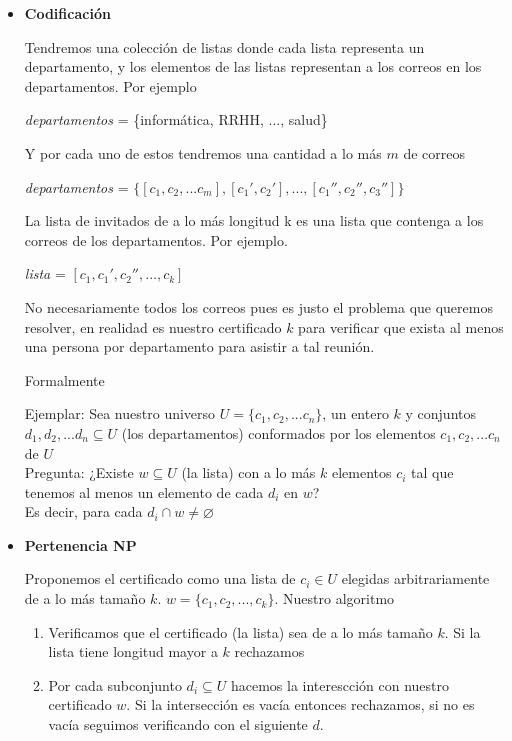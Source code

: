 \documentclass[12pt,letterpaper]{article}
\begin{document}
\begin{itemize}
    \item \textbf{Codificación}
    
    Tendremos una colección de listas donde cada lista representa un departamento, y los elementos de las listas representan a los correos en los departamentos. Por ejemplo 

    \textit{departamentos} = \{informática, RRHH, ..., salud\}

    Y por cada uno de estos tendremos una cantidad a lo más $m$ de correos 

    \textit{departamentos} = $\{[c_1, c_2, ... c_m], [c_{1}',c_{2}'], ...,[c_{1}'', c_{2}'',c_{3}'']\}$

    La lista de invitados de a lo más longitud k es una lista que contenga a los correos de los departamentos. Por ejemplo.

    \textit{lista} = $[c_1, c_1', c_2'', ..., c_k]$ 

    No necesariamente todos los correos pues es justo el problema que queremos resolver, en realidad es nuestro certificado $k$ para verificar que exista al menos una persona por departamento para asistir a tal reunión.

    Formalmente

    Ejemplar: Sea nuestro universo $U = \{c_1, c_2, ... c_n\}$, un entero $k$ y conjuntos\\ $d_1, d_2, ... d_n\subseteq U$ (los departamentos) conformados por los elementos $c_1, c_2, ... c_n$ de $U$\\
    Pregunta: ¿Existe $w \subseteq U$ (la lista) con a lo más $k$ elementos $c_i$ tal que tenemos al menos un elemento de cada $d_i$ en $w$?\\
    Es decir, para cada $d_i \cap w \neq \varnothing$

    
    \item \textbf{Pertenencia NP}
    
    Proponemos el certificado como una lista de $c_i \in U$ elegidas arbitrariamente de a lo más tamaño $k$. $w = \{c_1, c_2, ..., c_k\}$. 
    Nuestro algoritmo
    \begin{enumerate}
        \item Verificamos que el certificado (la lista) sea de a lo más tamaño $k$. Si la lista tiene longitud mayor a $k$ rechazamos 
        
        \item Por cada subconjunto $d_i \subseteq U$ hacemos la interescción con nuestro certificado $w$. Si la intersección es vacía entonces rechazamos, si no es vacía seguimos verificando con el siguiente $d$.
        

\end{enumerate}
\end{itemize}
\end{document}
